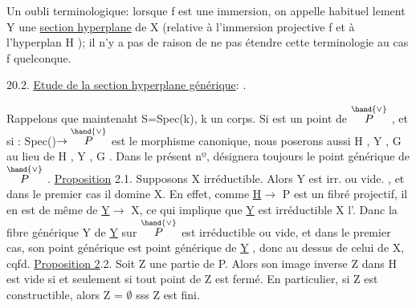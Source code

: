 
\margin{$|$}Un oubli terminologique: lorsque f est une immersion, on appelle habituel%
lement Y\hand{$_\zeta$} une \uline{section hyperplane} de X (relative à l'immersion projective
f et à l'hyperplan H  ); il n'y a pas de raison de ne pas étendre cette
terminologie au cas f quelconque.

20.2. \uline{Etude de la section hyperplane générique}:  .

Rappelons que maintenaht S=Spec(k), k un corps. Si \hand{$\eta$} est un point
de $\overset{\hand{\vee}}{P}$ ,  et si \hand{$\zeta$}: Spec(\hand{$\eta$})$\to\overset{\hand{\vee}}{P}$ est le morphisme canonique, nous poserons
aussi H\hand{$_\eta$} , Y\hand{$_\eta$} , G\hand{$_\eta$} au lieu de H\hand{$_\zeta$} , Y\hand{$_\zeta$} , G\hand{$_\zeta$} . Dans le présent nº, \hand{$\eta$}
désignera toujours le point générique de $\overset{\hand{\vee}}{P}$ .
\uline{Proposition} 2.1. Supposons X irréductible. Alors Y\hand{$_\eta$} est irr.  ou vide. ,
et dans le premier cas il domine X. 
En effet, comme \uline{H}$\longrightarrow$ P est un fibré projectif, il en est de même de
\uline{Y}$\longrightarrow$ X, ce qui implique que \uline{Y} est irréductible X l'. Danc la fibre
générique Y   de \uline{Y} sur $\overset{\hand{\vee}}{P}$ est irréductible ou vide, et dans le premier cas,
son point générique est point générique de \uline{Y} , donc au dessus de celui de
X, cqfd.
\uline{Proposition 2}.2. Soit Z une partie de P. Alors son image inverse Z\hand{$_\eta$} dans
H\hand{$_\eta$} est vide si et seulement si tout point de Z est fermé. En particulier,
si Z est constructible, alors Z\hand{$_\eta$} = $\emptyset$ sss Z est fini.


